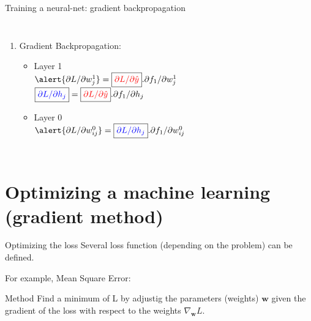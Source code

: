 \documentclass[handout]{beamer}
\begin{document}
\begin{frame}{Training a neural-net: gradient backpropagation}
\begin{columns}
\begin{enumerate}[<+->]
    \item \alert{Gradient Backpropagation:}
    \begin{itemize}
   \item Layer 1\\
   $\alert{\partial L/\partial w_j^1} = 
   \boxed{\color{red}\partial L/\partial \hat{y}}.
   \partial f_1 / \partial w^1_j$\\
   
   $ \boxed{\color{blue}\partial L/\partial h_j} = 
    \boxed{\color{red}\partial L/\partial \hat{y}}. 
   \partial f_1 / \partial h_j$
   
   \item Layer 0\\
   $\alert{\partial L/\partial w^0_{ij}}=
  \boxed{\color{blue}\partial L/\partial h_j}
   .\partial f_1 / \partial w^0_{ij}  $
    
    \end{itemize}
\end{enumerate}

\end{columns}

\end{frame}

\section{Optimizing a machine learning (gradient method)}

\begin{frame}{Optimizing the loss}
    Several loss function (depending on the problem) can be defined.
    
    For example, Mean Square Error:
    
    \begin{alertblock}{Method}
    Find a minimum of L by adjustig the parameters (weights) $\mathbf{w}$ given the gradient of the loss with respect to the weights $\nabla_\mathbf{w}L$.
    \end{alertblock}
\end{frame}
\end{document}
